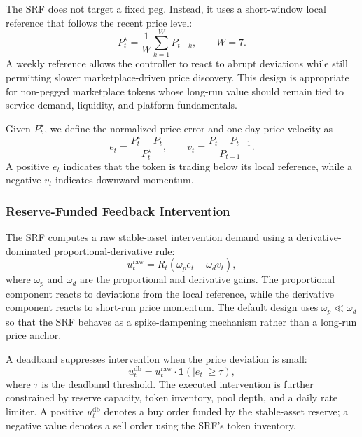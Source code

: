 \documentclass[a4paper,fleqn]{cas-dc}
\begin{document}
The SRF does not target a fixed peg. Instead, it uses a short-window local reference that follows the recent price level:
\begin{equation}
P_t^{\star}
=
\frac{1}{W}
\sum_{k=1}^{W} P_{t-k},
\qquad W=7.
\label{eq:local_reference}
\end{equation}
A weekly reference allows the controller to react to abrupt deviations while still permitting slower marketplace-driven price discovery. This design is appropriate for non-pegged marketplace tokens whose long-run value should remain tied to service demand, liquidity, and platform fundamentals.

Given $P_t^{\star}$, we define the normalized price error and one-day price velocity as
\begin{equation}
e_t =
\frac{P_t^{\star}-P_t}{P_t^{\star}},
\qquad
v_t =
\frac{P_t-P_{t-1}}{P_{t-1}}.
\label{eq:error_velocity}
\end{equation}
A positive $e_t$ indicates that the token is trading below its local reference, while a negative $v_t$ indicates downward momentum.

\subsubsection{Reserve-Funded Feedback Intervention}

The SRF computes a raw stable-asset intervention demand using a derivative-dominated proportional-derivative rule:
\begin{equation}
u_t^{\mathrm{raw}}
=
R_t
\left(
\omega_p e_t
-
\omega_d v_t
\right),
\label{eq:pd_raw}
\end{equation}
where $\omega_p$ and $\omega_d$ are the proportional and derivative gains. The proportional component reacts to deviations from the local reference, while the derivative component reacts to short-run price momentum. The default design uses $\omega_p \ll \omega_d$ so that the SRF behaves as a spike-dampening mechanism rather than a long-run price anchor.

A deadband suppresses intervention when the price deviation is small:
\begin{equation}
u_t^{\mathrm{db}}
=
u_t^{\mathrm{raw}}
\cdot
\mathbf{1}\left(|e_t|\geq \tau\right),
\label{eq:deadband}
\end{equation}
where $\tau$ is the deadband threshold. The executed intervention is further constrained by reserve capacity, token inventory, pool depth, and a daily rate limiter. A positive $u_t^{\mathrm{db}}$ denotes a buy order funded by the stable-asset reserve; a negative value denotes a sell order using the SRF's token inventory.
\end{document}
